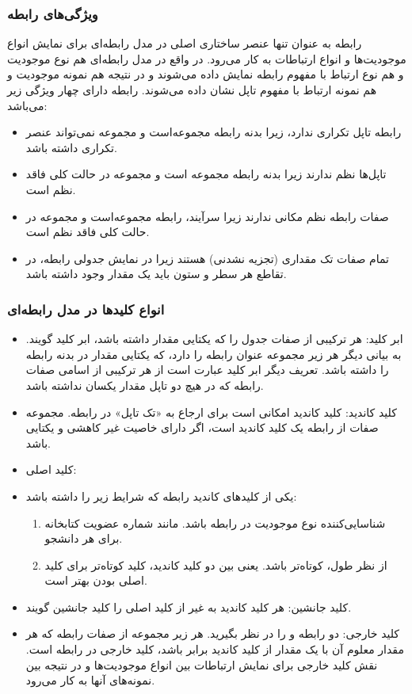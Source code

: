 {\subsubsection{ویژگی‌های رابطه}
رابطه به عنوان تنها عنصر ساختاری اصلی در مدل رابطه‌ای برای نمایش انواع موجودیت‌ها و انواع ارتباطات به کار می‌رود. در واقع در مدل رابطه‌ای هم نوع موجودیت و هم نوع ارتباط با مفهوم رابطه نمایش داده می‌شوند و در نتیجه هم نمونه موجودیت و هم نمونه ارتباط با مفهوم تاپل نشان داده می‌شوند. رابطه دارای چهار ویژگی زیر می‌باشد:
\begin{itemize}
  	\item رابطه تاپل تکراری ندارد، زیرا بدنه رابطه مجموعه‌است و مجموعه نمی‌تواند عنصر تکراری داشته باشد.
	\item تاپل‌ها نظم ندارند زیرا بدنه رابطه مجموعه‌ است و مجموعه در حالت کلی فاقد نظم است.
	\item صفات رابطه نظم مکانی ندارند زیرا سرآیند، رابطه مجموعه‌است و مجموعه در حالت کلی فاقد نظم است.
	\item تمام صفات تک مقداری (تجزیه نشدنی) هستند زیرا در نمایش جدولی رابطه، در تقاطع هر سطر و ستون باید یک مقدار وجود داشته باشد.
\end{itemize}

 
\subsubsection{انواع کلیدها در مدل رابطه‌ای}

\begin{itemize}
  	\item ابر کلید: هر ترکیبی از صفات جدول را که یکتایی مقدار داشته باشد، ابر کلید گویند. به بیانی دیگر هر زیر مجموعه عنوان رابطه را دارد، که یکتایی مقدار در بدنه رابطه را داشته باشد. تعریف دیگر ابر کلید عبارت است از هر ترکیبی از اسامی صفات رابطه که در هیچ دو تاپل مقدار یکسان نداشته باشد.

  	\item کلید کاندید: کلید کاندید امکانی است برای ارجاع به «تک تاپل» در رابطه. مجموعه صفات  از رابطه یک کلید کاندید است، اگر دارای خاصیت غیر کاهشی و یکتایی باشد.

  	\item کلید اصلی: 
  	\item یکی از کلیدهای کاندید رابطه که شرایط زیر را داشته باشد:
	\begin{enumerate}
		\item شناسایی‌کننده نوع موجودیت در رابطه باشد. مانند شماره عضویت کتابخانه برای هر دانشجو.
		\item از نظر طول، کوتاه‌تر باشد. یعنی بین دو کلید کاندید، کلید کوتاه‌تر برای کلید اصلی بودن بهتر است.
	\end{enumerate}
  	\item کلید جانشین: هر کلید کاندید به غیر از کلید اصلی را کلید جانشین گویند.
  	\item کلید خارجی: دو رابطه  و  را در نظر بگیرید. هر زیر مجموعه از صفات رابطه که هر مقدار معلوم آن با یک مقدار از کلید کاندید برابر باشد، کلید خارجی در رابطه است. نقش کلید خارجی برای نمایش ارتباطات بین انواع موجودیت‌ها و در نتیجه بین نمونه‌های آنها به کار می‌رود.


\end{itemize}}
